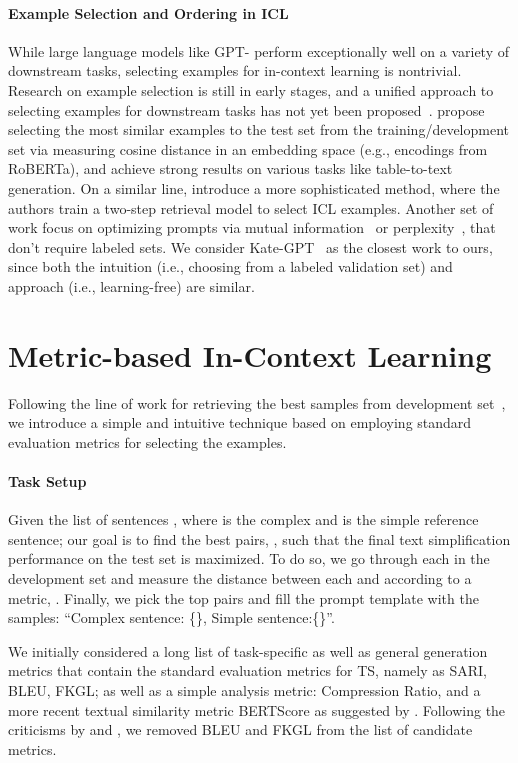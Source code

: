 \documentclass[11pt]{article}
\begin{document}
\paragraph{Example Selection and Ordering in ICL} While large language models like GPT- perform exceptionally well on a variety of downstream tasks, selecting examples for in-context learning is nontrivial. Research on example selection is still in early stages, and a unified approach to selecting examples for downstream tasks has not yet been proposed~\citep{surveyICL}. \citet{kategpt} propose selecting the  most similar examples to the test set from the training/development set via measuring cosine distance in an embedding space (e.g., encodings from RoBERTa), and achieve strong results on various tasks like table-to-text generation. On a similar line, \citet{rubin-etal-2022-learning} introduce a more sophisticated method, where the authors train a two-step retrieval model to select ICL examples. Another set of work focus on optimizing prompts via mutual information~\citep{SorensenRRSRDKF22} or perplexity~\citep{Gonen22}, that don't require labeled sets. We consider Kate-GPT~\citep{kategpt} as the closest work to ours, since both the intuition (i.e., choosing from a labeled validation set) and approach (i.e., learning-free) are similar. 

 

\section{Metric-based In-Context Learning}
Following the line of work for retrieving the best samples from development set~\cite{kategpt,SorensenRRSRDKF22}, we introduce a simple and intuitive technique based on employing standard evaluation metrics for selecting the examples. 

\paragraph{Task Setup} Given the list of sentences , where  is the complex and  is the simple reference sentence; our goal is to find the best  pairs, , such that the final text simplification performance on the test set is maximized. To do so, we go through each  in the development set and measure the distance between each  and  according to a metric, . Finally, we pick the top  pairs and fill the prompt template with the samples: ``Complex sentence: \{\}, Simple sentence:\{\}''.    

We initially considered a long list of task-specific as well as general generation metrics that contain the standard evaluation metrics for TS, namely as SARI, BLEU, FKGL; as well as a simple analysis metric: Compression Ratio, and a more recent textual similarity metric BERTScore as suggested by \citet{alva-manchego-etal-2021-un}. Following the criticisms by \citet{sulem-etal-2018-bleu} and \citet{tanprasert-kauchak-2021-flesch}, we removed BLEU and FKGL from the list of candidate metrics.
\end{document}
